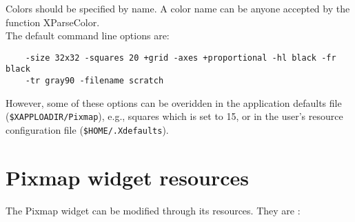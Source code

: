 \noindent
Colors should be specified by name. A color name can be anyone
accepted by the function XParseColor.\\

\noindent
The default command line options are:
\begin{verbatim} 
    -size 32x32 -squares 20 +grid -axes +proportional -hl black -fr black 
    -tr gray90 -filename scratch
\end{verbatim} 
However, some of these options can be overidden in the application
defaults file ({\tt \$XAPPLOADIR/Pixmap}), e.g., squares
which is set to 15, or in the user's resource configuration file
({\tt \$HOME/.Xdefaults}). 

\section{Pixmap widget resources}
The Pixmap widget can be modified through its resources. They are :\\

